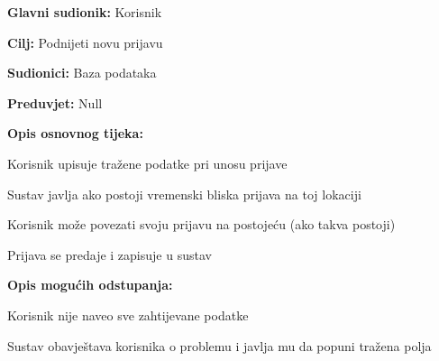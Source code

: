 					\noindent {}
					\begin{packed_item}
	
						\item \textbf{Glavni sudionik: }Korisnik
						\item  \textbf{Cilj:} Podnijeti novu prijavu
						\item  \textbf{Sudionici:} Baza podataka
						\item  \textbf{Preduvjet:} Null
						\item  \textbf{Opis osnovnog tijeka:}
						
						\item[] \begin{packed_enum}
	
							\item Korisnik upisuje tražene podatke pri unosu prijave 
							\item Sustav javlja ako postoji vremenski bliska prijava na toj lokaciji
							\item Korisnik može povezati svoju prijavu na postojeću (ako takva postoji)
							\item Prijava se predaje i zapisuje u sustav
						\end{packed_enum}
						
						\item  \textbf{Opis mogućih odstupanja:}
						
						\item[] \begin{packed_item}
	
							\item[1.a] Korisnik nije naveo sve zahtijevane podatke
							\item[] \begin{packed_enum}
								
								\item Sustav obavještava korisnika o problemu i javlja mu da popuni tražena polja
								
							\end{packed_enum}
							
						\end{packed_item}
					\end{packed_item}
					
					\pagebreak
					

